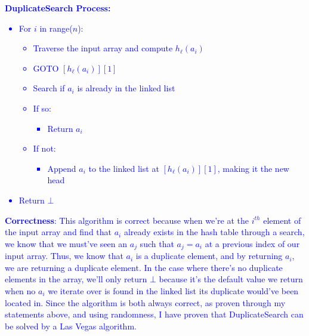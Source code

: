 \documentclass[11pt]{article}
\begin{document}
\begin{enumerate}
\begin{enumerate}
\textcolor{blue}{
\textbf{DuplicateSearch Process:}
\begin{itemize}
    \item For \( i \) in range(\( n \)):
    \begin{itemize}
        \item Traverse the input array and compute \( h_{\ell}(a_i) \)
        \item GOTO \( [h_{\ell}(a_i)][1] \)
        \item Search if \( a_i \) is already in the linked list
        \item If so:
        \begin{itemize}
            \item Return \( a_i \)
        \end{itemize}
        \item If not:
        \begin{itemize}
            \item Append \( a_i \) to the linked list at \( [h_{\ell}(a_i)][1] \), making it the new head
        \end{itemize}
    \end{itemize}
    \item Return $\bot$ \\
\end{itemize}
} 

\textcolor{blue}{
\textbf{Correctness}:
        This algorithm is correct because when we're at the $i^{th}$ element of the input array and find that $a_i$ already exists in the hash table through a search, we know that we must've seen an $a_j$ such that $a_j = a_i$ at a previous index of our input array. Thus, we know that $a_i$ is a duplicate element, and by returning $a_i$, we are returning a duplicate element. In the case where there's no duplicate elements in the array, we'll only return $\bot$ because it's the default value we return when no $a_i$ we iterate over is found in the linked list its duplicate would've been located in. Since the algorithm is both always correct, as proven through my statements above, and using randomness, I have proven that DuplicateSearch can be solved by a Las Vegas algorithm.
    } \\


\end{enumerate}
\end{enumerate}
\end{document}
